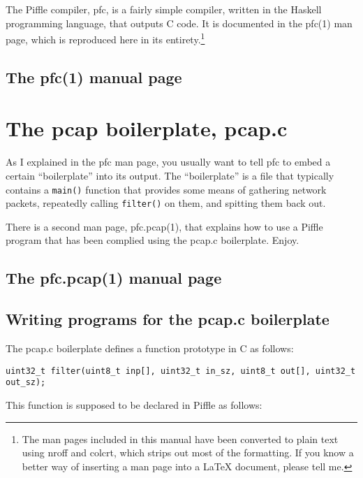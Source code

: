 \documentclass[a4paper,12pt]{scrreprt}
\begin{document}
The Piffle compiler, pfc, is a fairly simple compiler, written in the
Haskell programming language, that outputs C code.  It is documented
in the pfc(1) man page, which is reproduced here in its
entirety.\footnote{The man pages included in this manual have been
converted to plain text using nroff and colcrt, which strips out most
of the formatting. If you know a better way of inserting a man page
into a \LaTeX{} document, please tell me.}

\section{The pfc(1) manual page}


\chapter{The pcap boilerplate, pcap.c}

As I explained in the pfc man page, you usually want to tell pfc to
embed a certain ``boilerplate'' into its output. The ``boilerplate''
is a file that typically contains a \verb.main(). function that
provides some means of gathering network packets, repeatedly calling
\verb.filter(). on them, and spitting them back out.

There is a second man page, pfc.pcap(1), that explains how to use a
Piffle program that has been complied using the pcap.c
boilerplate. Enjoy.

\section{The pfc.pcap(1) manual page}


\section{Writing programs for the pcap.c boilerplate}

The pcap.c boilerplate defines a function prototype  in
C as follows:

\begin{verbatim}
uint32_t filter(uint8_t inp[], uint32_t in_sz, uint8_t out[], uint32_t out_sz);
\end{verbatim}

This function is supposed to be declared in Piffle as follows:
\end{document}
